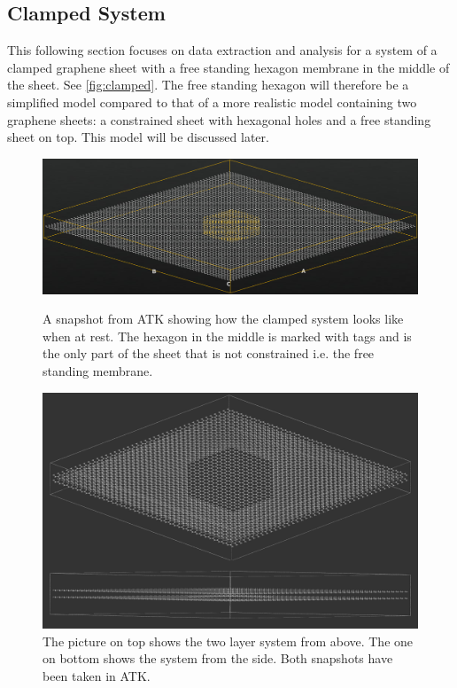 \subsection{Clamped System}
This following section focuses on data extraction and analysis for a system of a clamped graphene sheet with a free standing hexagon membrane in the middle of the sheet. See \cref{fig:clamped}. The free standing hexagon will therefore be a simplified model compared to that of a more realistic model containing two graphene sheets: a constrained sheet with hexagonal holes and a free standing sheet on top. This model will be discussed later.
\onecolumngrid

\begin{figure}[H]
    \centering
    \includegraphics[width=\columnwidth]{Figures/NanoLayer5nm.png}
    \caption{A snapshot from ATK\cite{QuantumWise} showing how the clamped system looks like when at rest. The hexagon in the middle is marked with tags and is the only part of the sheet that is not constrained i.e. the free standing membrane.}
    \label{fig:clamped}

\vspace{0em}

    \centering
    \includegraphics[width=\columnwidth]{Figures/DoubleMembrane.png}
\caption{The picture on top shows the two layer system from above. The one on bottom shows the system from the side. Both snapshots have been taken in ATK\cite{QuantumWise}.}
\label{interlayersys}
\end{figure}
\clearpage
\twocolumngrid

